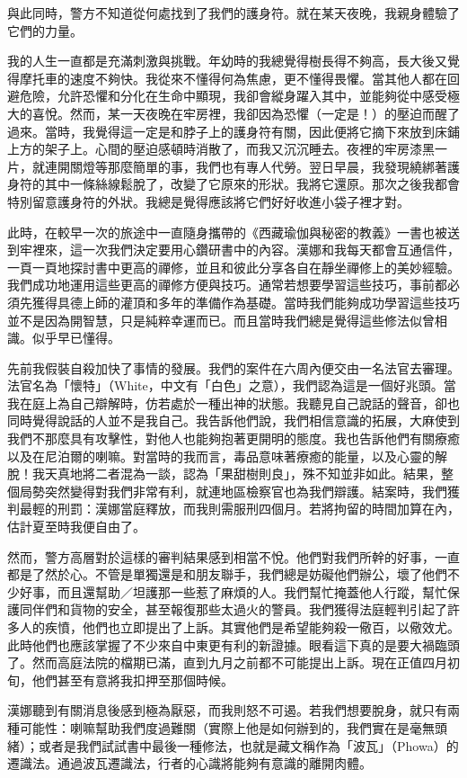 與此同時，警方不知道從何處找到了我們的護身符。就在某天夜晚，我親身體驗了它們的力量。

我的人生一直都是充滿刺激與挑戰。年幼時的我總覺得樹長得不夠高，長大後又覺得摩托車的速度不夠快。我從來不懂得何為焦慮，更不懂得畏懼。當其他人都在回避危險，允許恐懼和分化在生命中顯現，我卻會縱身躍入其中，並能夠從中感受極大的喜悅。然而，某一天夜晚在牢房裡，我卻因為恐懼（一定是！）的壓迫而醒了過來。當時，我覺得這一定是和脖子上的護身符有關，因此便將它摘下來放到床鋪上方的架子上。心間的壓迫感頓時消散了，而我又沉沉睡去。夜裡的牢房漆黑一片，就連開關燈等那麼簡單的事，我們也有專人代勞。翌日早晨，我發現繞綁著護身符的其中一條絲線鬆脫了，改變了它原來的形狀。我將它還原。那次之後我都會特別留意護身符的外狀。我總是覺得應該將它們好好收進小袋子裡才對。

此時，在較早一次的旅途中一直隨身攜帶的《西藏瑜伽與秘密的教義》一書也被送到牢裡來，這一次我們決定要用心鑽研書中的內容。漢娜和我每天都會互通信件，一頁一頁地探討書中更高的禪修，並且和彼此分享各自在靜坐禪修上的美妙經驗。我們成功地運用這些更高的禪修方便與技巧。通常若想要學習這些技巧，事前都必須先獲得具德上師的灌頂和多年的準備作為基礎。當時我們能夠成功學習這些技巧並不是因為開智慧，只是純粹幸運而已。而且當時我們總是覺得這些修法似曾相識。似乎早已懂得。

先前我假裝自殺加快了事情的發展。我們的案件在六周內便交由一名法官去審理。法官名為「懷特」（White，中文有「白色」之意），我們認為這是一個好兆頭。當我在庭上為自己辯解時，仿若處於一種出神的狀態。我聽見自己說話的聲音，卻也同時覺得說話的人並不是我自己。我告訴他們說，我們相信意識的拓展，大麻使到我們不那麼具有攻擊性，對他人也能夠抱著更開明的態度。我也告訴他們有關療癒以及在尼泊爾的喇嘛。對當時的我而言，毒品意味著療癒的能量，以及心靈的解脫！我天真地將二者混為一談，認為「果甜樹則良」，殊不知並非如此。結果，整個局勢突然變得對我們非常有利，就連地區檢察官也為我們辯護。結案時，我們獲判最輕的刑罰：漢娜當庭釋放，而我則需服刑四個月。若將拘留的時間加算在內，估計夏至時我便自由了。

然而，警方高層對於這樣的審判結果感到相當不悅。他們對我們所幹的好事，一直都是了然於心。不管是單獨還是和朋友聯手，我們總是妨礙他們辦公，壞了他們不少好事，而且還幫助／坦護那一些惹了麻煩的人。我們幫忙掩蓋他人行蹤，幫忙保護同伴們和貨物的安全，甚至報復那些太過火的警員。我們獲得法庭輕判引起了許多人的疾憤，他們也立即提出了上訴。其實他們是希望能夠殺一儆百，以儆效尤。此時他們也應該掌握了不少來自中東更有利的新證據。眼看這下真的是要大禍臨頭了。然而高庭法院的檔期已滿，直到九月之前都不可能提出上訴。現在正值四月初旬，他們甚至有意將我扣押至那個時候。

漢娜聽到有關消息後感到極為厭惡，而我則怒不可遏。若我們想要脫身，就只有兩種可能性：喇嘛幫助我們度過難關（實際上他是如何辦到的，我們實在是毫無頭緒）；或者是我們試試書中最後一種修法，也就是藏文稱作為「波瓦」（Phowa）的遷識法。通過波瓦遷識法，行者的心識將能夠有意識的離開肉體。


